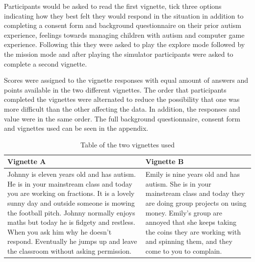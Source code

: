 \documentclass[11pt]{report}
\begin{document}
Participants would be asked to read the first vignette, tick three options indicating how they best felt they would respond in the situation in addition to completing a consent form and background questionnaire on their prior autism experience, feelings towards managing children with autism and computer game experience. Following this they were asked to play the explore mode followed by the mission mode and after playing the simulator participants were asked to complete a second vignette. 

Scores were assigned to the vignette responses with equal amount of answers and points available in the two different vignettes. The order that participants completed the vignettes were alternated to reduce the possibility that one was more difficult than the other affecting the data. In addition, the responses and value were in the same order. The full background questionnaire, consent form and vignettes used can be seen in the appendix.

\begin{table}[H]
    \begin{tabular}{| p{8cm} | p{8cm} |}
    \hline
    \textbf{Vignette A} & \textbf{Vignette B}                                                                                                                                                                             \\    
    \hline
    \hline
    Johnny is eleven years old and has autism. He is in your mainstream class and today you are working on fractions. It is a lovely sunny day and outside someone is mowing the football pitch.  Johnny normally enjoys maths but today he is fidgety and restless.  When you ask him why he doesn't respond.  Eventually he jumps up and leave the classroom without asking permission. & Emily is nine years old and has autism. She is in your mainstream class and today they are doing group projects on using money. Emily's group are annoyed that she keeps taking the coins they are working with and spinning them, and they come to you to complain.\\ 
    \hline
    \end{tabular}
    \caption{Table of the two vignettes used}
\end{table}
\end{document}
